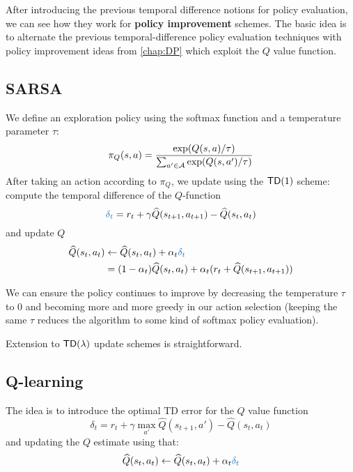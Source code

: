 \documentclass[../course-notes.tex]{subfiles}
\begin{document}
After introducing the previous temporal difference notions for policy evaluation, we can see how they work for \textbf{policy improvement} schemes. The basic idea is to alternate the previous temporal-difference policy evaluation techniques with policy improvement ideas from \cref{chap:DP} which exploit the $Q$ value function.

\subsection{SARSA}

We define an exploration policy using the softmax function and a temperature parameter $\tau$:
\[
	\pi_Q(s,a) =
	\frac{\exp(Q(s,a)/\tau)}{
		\sum_{a'\in\mathcal{A}} \exp(Q(s,a')/\tau)
	}
\]
After taking an action according to $\pi_Q$, we update using the $\mathsf{TD}(1)$ scheme: compute the temporal difference of the $Q$-function
\begin{equation}\label{eq:QfuncTDerror}
	{\bluefont \delta_t} = r_t + \gamma \widehat{Q}(s_{t+1}, a_{t+1}) - \widehat{Q}(s_t, a_t)
\end{equation}
and update $Q$
\begin{equation*}
\begin{aligned}
	\widehat{Q}(s_t, a_t) &\leftarrow
	\widehat{Q}(s_t, a_t) + \alpha_t {\bluefont \delta_t}  \\
	&= (1-\alpha_t)\widehat{Q}(s_t, a_t)
	+ \alpha_t (r_t + \widehat{Q}(s_{t+1}, a_{t+1}))
\end{aligned}
\end{equation*}

We can ensure the policy continues to improve by decreasing the temperature $\tau$ to 0 and becoming more and more greedy in our action selection (keeping the same $\tau$ reduces the algorithm to some kind of softmax policy evaluation).

Extension to $\mathsf{TD}(\lambda)$ update schemes is straightforward.



\subsection{Q-learning}

The idea is to introduce the optimal TD error for the $Q$ value function
\begin{equation}
	\delta_t = r_t + \gamma \max_{a'}\widehat{Q}(s_{t+1},a') - \widehat{Q}(s_t,a_t)
\end{equation}
and updating the $Q$ estimate using that:
\[
	\widehat{Q}(s_t,a_t) \leftarrow \widehat{Q}(s_t,a_t) + \alpha_t {\bluefont\delta_t}
\]
\end{document}
